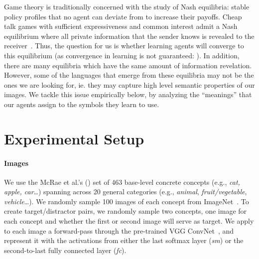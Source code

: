 Game theory is traditionally concerned with the study of Nash equilibria: stable policy profiles that no agent can deviate from to increase their payoffs. Cheap talk games with sufficient expressiveness and common interest admit a Nash equilibrium where all private information that the sender knows is revealed to the receiver~\citep{crawford1982strategic}. Thus, the question for us is whether learning agents will converge to this equilibrium (as convergence in learning is not guaranteed: \citealt{fudenberg2014recency}).  In addition, there are many equilibria which have the same amount of information revelation. However, some of the languages that emerge from these equilibria may not be the ones we are looking for, ie. they may capture high level semantic properties of our images. We tackle this issue empirically below, by analyzing the ``meanings'' that our agents assign to the symbols they learn to use. 

\section{Experimental Setup}
\label{sec:experimental-setup}

\paragraph{Images} We use the McRae et al.'s
(\citeyear{McRae:etal:2005}) set of 463 base-level concrete
concepts (e.g., \emph{cat, apple, car}\ldots) spanning across 20
general categories (e.g., \emph{animal}, \emph{fruit/vegetable},
\emph{vehicle}\ldots). We randomly sample 100 images of each concept
from ImageNet~\citep{Deng:etal:2009}. To create target/distractor
pairs, we randomly sample two concepts, one image for each concept and
whether the first or second image will serve as target. We apply to
each image a forward-pass through the pre-trained VGG ConvNet~\cite{Simonyan:Zisserman:2014}, and represent it with the activations from either
the last softmax layer (\emph{sm}) or the second-to-last fully
connected layer (\emph{fc}).
%

